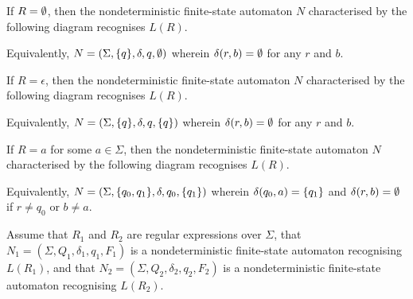     If \(R = \emptyset\), then the nondeterministic finite-state automaton \(N\)
    characterised by the following diagram recognises \(L(R)\).
    \begin{figure}[!ht]
        \centering
    \end{figure}

    \noindent Equivalently, \(N = (\Sigma, \{q\}, \delta, q, \emptyset)\) wherein
    \(\delta(r, b) = \emptyset\) for any \(r\) and \(b\).

    If \(R = \epsilon\), then the nondeterministic finite-state automaton \(N\)
    characterised by the following diagram recognises \(L(R)\).
    \begin{figure}[!ht]
        \centering
    \end{figure}

    \noindent Equivalently, \(N = (\Sigma, \{q\}, \delta, q, \{q\})\)
    wherein \(\delta(r, b) = \emptyset\) for any \(r\) and \(b\).

    If \(R = a\) for some \(a \in \Sigma\), then the nondeterministic
    finite-state automaton \(N\) characterised by the following diagram
    recognises \(L(R)\).
    \begin{figure}[!ht]
        \centering
    \end{figure}

    \noindent Equivalently, \(N = (\Sigma, \{q_0, q_1\}, \delta, q_0,
    \{q_1\})\) wherein \(\delta(q_0, a) = \{q_1\}\) and \(\delta(r, b) =
    \emptyset\) if \(r \neq q_0\) or \(b \neq a\).

    Assume that \(R_1\) and \(R_2\) are regular expressions over \(\Sigma\),
    that \(N_1 = (\Sigma, Q_1, \delta_1, q_1, F_1)\) is a nondeterministic
    finite-state automaton recognising \(L(R_1)\), and that \(N_2 = (\Sigma,
    Q_2, \delta_2, q_2, F_2)\) is a nondeterministic finite-state automaton
    recognising \(L(R_2)\).

